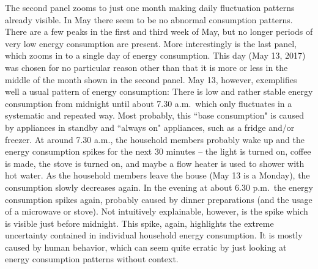 The second panel zooms to just one month making daily fluctuation patterns already visible. In May there seem to be no abnormal consumption patterns. There are a few peaks in the first and third week of May, but no longer periods of very low energy consumption are present. More interestingly is the last panel, which zooms in to a single day of energy consumption. This day (May 13, 2017) was chosen for no particular reason other than that it is more or less in the middle of the month shown in the second panel. May 13, however, exemplifies well a usual pattern of energy consumption: There is low and rather stable energy consumption from midnight until about 7.30 a.m.~which only fluctuates in a systematic and repeated way. Most probably, this ``base consumption" is caused by appliances in standby and ``always on" appliances, such as a fridge and/or freezer. At around 7.30 a.m., the household members probably wake up and the energy consumption spikes for the next 30 minutes -- the light is turned on, coffee is made, the stove is turned on, and maybe a flow heater is used to shower with hot water. As the household members leave the house (May 13 is a Monday), the consumption slowly decreases again. In the evening at about 6.30 p.m.~the energy consumption spikes again, probably caused by dinner preparations (and the usage of a microwave or stove). Not intuitively explainable, however, is the spike which is visible just before midnight. This spike, again, highlights the extreme uncertainty contained in individual household energy consumption. It is mostly caused by human behavior, which can seem quite erratic by just looking at energy consumption patterns without context.

